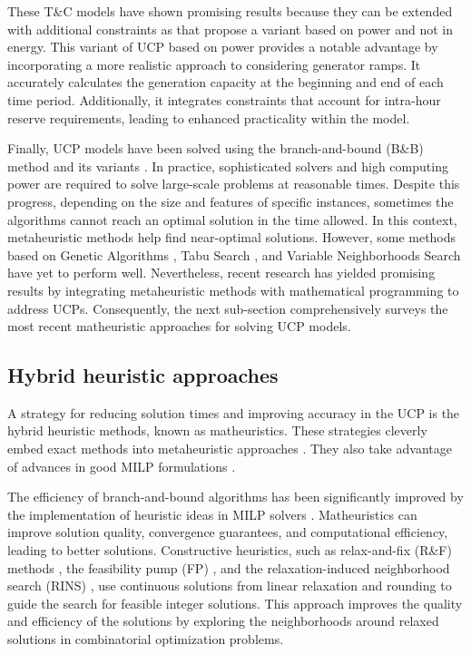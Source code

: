 These T\&C models have shown promising results because they can be extended with additional constraints as \citet{Nycander2021} that propose a variant based on power and not in energy. This variant of UCP based on power provides a notable advantage by incorporating a more realistic approach to considering generator ramps. It accurately calculates the generation capacity at the beginning and end of each time period. Additionally, it integrates constraints that account for intra-hour reserve requirements, leading to enhanced practicality within the model.

Finally, UCP models have been solved using the branch-and-bound (B\&B) method and its variants \citep{Wolsey2021}. In practice, sophisticated solvers and high computing power are required to solve large-scale problems at reasonable times. Despite this progress, depending on the size and features of specific instances, sometimes the algorithms cannot reach an optimal solution in the time allowed. In this context, metaheuristic methods help find near-optimal solutions. However, some methods based on Genetic Algorithms \citep{Kazarlis1996}, Tabu Search \citep{Mori1996}, and Variable Neighborhoods Search \citep{Todosijevic2016}  have yet to perform well. Nevertheless, recent research has yielded promising results by integrating metaheuristic methods with mathematical programming to address UCPs. Consequently, the next sub-section comprehensively surveys the most recent matheuristic approaches for solving UCP models.


\subsection{Hybrid heuristic approaches}

A strategy for reducing solution times and improving accuracy in the UCP is the hybrid heuristic methods, known as matheuristics. These strategies cleverly embed exact methods into metaheuristic approaches \citep{2023_itor_Boschetti,Maniezzo2021}. They also take advantage of advances in good MILP formulations \citep{Fischetti2016}. 

The efficiency of branch-and-bound algorithms has been significantly improved by the implementation of heuristic ideas in MILP solvers \citep{Wolsey2021}. Matheuristics can improve solution quality, convergence guarantees, and computational efficiency, leading to better solutions. Constructive heuristics, such as relax-and-fix (R\&F) methods \citep{Wolsey2021}, the feasibility pump (FP) \citep{Fischetti2003}, and the relaxation-induced neighborhood search (RINS) \citep{Danna2005}, use continuous solutions from linear relaxation and rounding to guide the search for feasible integer solutions. This approach improves the quality and efficiency of the solutions by exploring the neighborhoods around relaxed solutions in combinatorial optimization problems.

